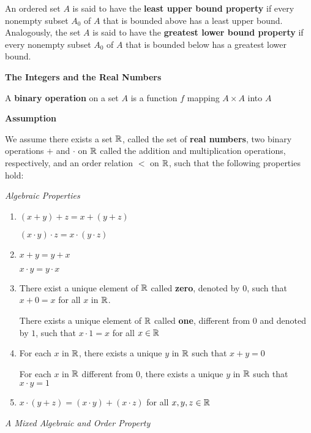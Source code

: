 \begin{define}
	An ordered set $A$ is said to have the \textbf{least upper bound property} if every nonempty subset $A_0$ of $A$ that is bounded above has a least upper bound. Analogously, the set $A$ is said to have the \textbf{greatest lower bound property} if every nonempty subset $A_0$ of $A$ that is bounded below has a greatest lower bound.
\end{define}


\textbf{The Integers and the Real Numbers}

\begin{define}
	A \textbf{binary operation} on a set $A$ is a function $f$ mapping $A \times A$ into $A$ 
\end{define}

\textbf{Assumption}

We assume there exists a set $ \mathbb{R} $, called the set of \textbf{real numbers}, two binary operations $+$ and $ \cdot$ on $ \mathbb{R} $ called the addition and multiplication operations, respectively, and an order relation $ <$ on $ \mathbb{R}$, such that the following properties hold:

\textit{Algebraic Properties}
\begin{enumerate}
	\item $ (x + y ) + z = x + (y+z) $ 
	
	$ (x \cdot y) \cdot z = x \cdot(y \cdot z) $
	
	\item $ x + y = y + x $
	
	$ x \cdot y = y \cdot x $
	
	\item There exist a unique element of $\mathbb{R}$ called \textbf{zero}, denoted by $0$, such that $ x+ 0 = x$ for all $x$ in $\mathbb{R}$.
	
	There exists a unique element of $\mathbb{R}$ called \textbf{one}, different from $0$ and denoted by $1$, such that $ x \cdot 1 = x$ for all $x \in \mathbb{R}$
	\item For each $x$ in $\mathbb{R}$, there exists a unique $y$ in $\mathbb{R}$ such that $ x+ y = 0$
	
	For each $x$ in $\mathbb{R}$ different from $0$, there exists a unique $y$ in $\mathbb{R}$ such that $x\cdot y = 1$ 
	
	\item $ x \cdot (y +z) = (x \cdot y )+ (x \cdot z)$ for all $x,y,z \in \mathbb{R}$
	
\end{enumerate}

\textit{A Mixed Algebraic and Order Property}

